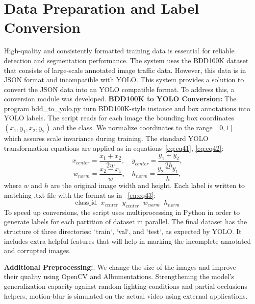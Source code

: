 \documentclass[12pt,a4paper]{report}
\theoremstyle{definition}
\theoremstyle{remark}
\begin{document}
\section{Data Preparation and Label Conversion}
High-quality and consistently formatted training data is essential for reliable detection and segmentation performance. The system uses the BDD100K dataset that consists of large-scale annotated image traffic data. However, this data is in JSON format and incompatible with YOLO. This system provides a solution to convert the JSON data into an YOLO compatible format. To address this, a conversion module was developed. \textbf{BDD100K to YOLO Conversion:} The program bdd\_to\_yolo.py turn BDD100K-style instance and box annotations into YOLO labels. The script reads for each image the bounding box coordinates $(x_1,y_1,x_2,y_2)$ and the class. We normalize coordinates to the range $[0,1]$ which assures scale invariance during training. The standard YOLO transformation equations are applied as in equations~\ref{eq:eq41}, \ref{eq:eq42}:
\begin{equation}
\label{eq:eq41}
x_{center} = \frac{x_1 + x_2}{2w}, \quad 
y_{center} = \frac{y_1 + y_2}{2h},
\end{equation}
\begin{equation}
\label{eq:eq42}
w_{norm} = \frac{x_2 - x_1}{w}, \quad 
h_{norm} = \frac{y_2 - y_1}{h},
\end{equation}
where $w$ and $h$ are the original image width and height.
Each label is written to matching .txt file with the format as in ~\ref{eq:eq43}:  
\begin{equation}
\label{eq:eq43}
\text{class\_id} \;\; x_{center} \;\; y_{center} \;\; w_{norm} \;\; h_{norm}
\end{equation}
To speed up conversions, the script uses multiprocessing in Python in order to generate labels for each partition of dataset in parallel. The final dataset has the structure of three directories: `train`, `val`, and `test`, as expected by YOLO. It includes extra helpful features that will help in marking the incomplete annotated and corrupted images.

\noindent \textbf{Additional Preprocessing:}.
We change the size of the images and improve their quality using OpenCV and Albumentations. Strengthening the model’s generalization capacity against random lighting conditions and partial occlusions helpers, motion-blur is simulated on the actual video using external applications.
\end{document}
